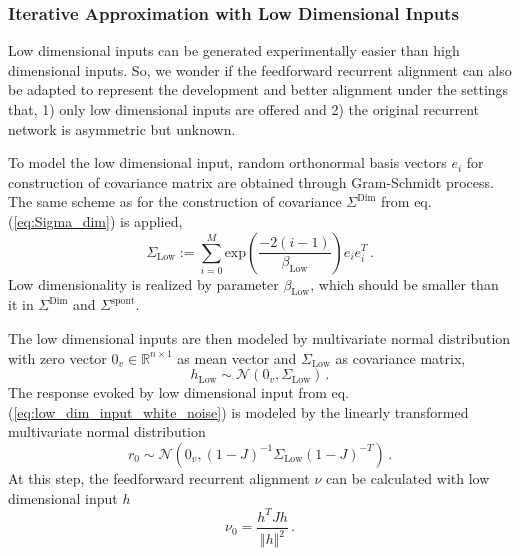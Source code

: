 \documentclass[11pt]{article}
\begin{document}
	\subsubsection{Iterative Approximation with Low Dimensional Inputs} \label{sec:repeat_low_dim_inputs}
	Low dimensional inputs can be generated experimentally easier than high dimensional inputs. %
	So, we wonder if the feedforward recurrent alignment can also be adapted to represent the development and better alignment under the settings that, 1) only low dimensional inputs are offered and 2) the original recurrent network is asymmetric but unknown.
	
	To model the low dimensional input, random orthonormal basis vectors $e_i$ for construction of covariance matrix are obtained through Gram-Schmidt process. The same scheme as for the construction of covariance $\Sigma^{\text{Dim}}$ from eq.(\ref{eq:Sigma_dim}) is applied, 
		\begin{equation}
			\Sigma_{\text{Low}} := \sum_{i=0}^{M} \text{exp}\left(\frac{-2(i-1)}{\beta_{\text{Low}}}\right) e_i e_i^T \, .
		\end{equation}
	Low dimensionality is realized by parameter $\beta_{\text{Low}}$, which should be smaller than it in $\Sigma^{\text{Dim}}$ and $\Sigma^{\text{spont}}$.
	
	The low dimensional inputs are then modeled by multivariate normal distribution with zero vector $0_v \in \mathbb{R}^{n \times 1}$ as mean vector and $\Sigma_{\text{Low}}$ as covariance matrix, 
		\begin{equation} \label{eq:low_dim_input_white_noise}
			h_{\text{Low}} \sim \mathcal{N}(0_v, \Sigma_{\text{Low}}) \, .
		\end{equation}
	The response evoked by low dimensional input from eq.(\ref{eq:low_dim_input_white_noise}) is modeled by the linearly transformed multivariate normal distribution
		\begin{equation}
			r_0 \sim \mathcal{N}\left( 0_v, (1-J)^{-1} \Sigma_{\text{Low}} (1-J)^{-T} \right) \, .
		\end{equation}
	At this step, the feedforward recurrent alignment $\nu$ can be calculated with low dimensional input $h$ 
		\begin{equation} \label{eq:repeat_low_dim_ffrec}
			\nu_0 = \frac{h^T J h}{\Vert h \Vert^2} \,.
		\end{equation} 
	
\end{document}
